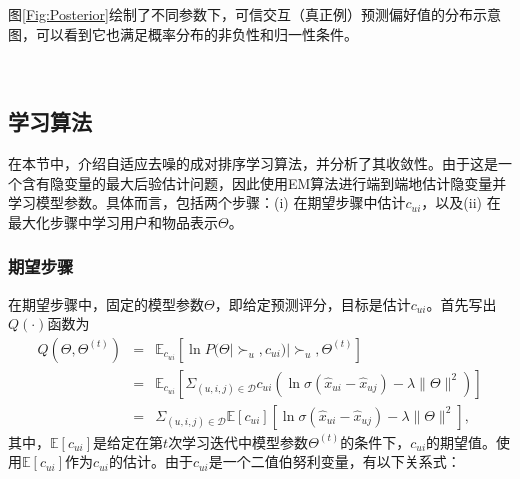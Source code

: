 图\ref{Fig:Posterior}绘制了不同参数下，可信交互（真正例）预测偏好值的分布示意图，可以看到它也满足概率分布的非负性和归一性条件。

\begin{figure*}[t]
	\centering
	\\
	\caption{不同参数下后验分布的概率密度及累积分布函数示意图}
	\label{Fig:Posterior}
\end{figure*}

\subsection{学习算法}
在本节中，介绍自适应去噪的成对排序学习算法，并分析了其收敛性。由于这是一个含有隐变量的最大后验估计问题，因此使用EM算法\cite{Dempster:1977:RSS}进行端到端地估计隐变量并学习模型参数。具体而言，包括两个步骤：(i) 在期望步骤中估计$c_{ui}$，以及(ii) 在最大化步骤中学习用户和物品表示$\Theta$。

\subsubsection{期望步骤}
\newpage
在期望步骤中，固定的模型参数$\Theta$，即给定预测评分，目标是估计$c_{ui}$。首先写出$Q(\cdot)$函数\cite{Dempster:1977:RSS}为 
\begin{eqnarray}\label{Eq:QDef}
 Q(\Theta, \Theta^{(t)}) 
	& = & \mathbb{E}_{c_{ui} } \left[ \ln P(\Theta|\succ_u, c_{ui}) | \succ_u, \Theta^{(t)} \right] \nonumber \\
	& = & \mathbb{E}_{c_{ui}} \left[ \Sigma_{(u,i,j)\in \mathcal{D}} c_{ui} \left( \ln \sigma(\hat{x}_{ui} - \hat{x}_{uj}) - \lambda \| \Theta \|^2 \right) \right] \nonumber \\
	& = & \Sigma_{(u,i,j) \in \mathcal{D}} \mathbb{E}[c_{ui}] \left[ \ln \sigma(\hat{x}_{ui} - \hat{x}_{uj}) - \lambda \| \Theta \|^2 \right],
\end{eqnarray}
其中，$\mathbb{E}[c_{ui}]$是给定在第$t$次学习迭代中模型参数$\Theta^{(t)}$的条件下，$c_{ui}$的期望值。使用$\mathbb{E}[c_{ui}]$作为$c_{ui}$的估计。由于$c_{ui}$是一个二值伯努利变量，有以下关系式：

